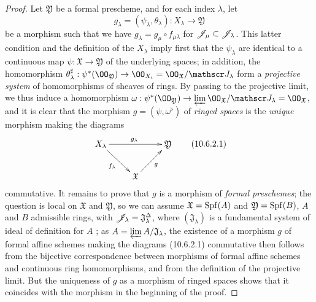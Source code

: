 \begin{proof}
\label{proof-1.10.6.2}
Let $\mathfrak{Y}$ be a formal prescheme, and for each index $\lambda$, let
\[
  g_\lambda=(\psi_\lambda,\theta_\lambda):X_\lambda\to\mathfrak{Y}
\]
be a morphism such that we have $g_\lambda=g_\mu\circ f_{\mu\lambda}$ for $\mathscr{J}_\mu\subset\mathscr{J}_\lambda$.
This latter condition and the definition of the $X_\lambda$ imply first that the $\psi_\lambda$ are identical to a continuous map $\psi:\mathfrak{X}\to\mathfrak{Y}$ of the underlying spaces; in addition, the homomorphism $\theta_\lambda^\sharp:\psi^*(\OO_\mathfrak{Y})\to\OO_{X_i}=\OO_\mathfrak{X}/\sh{J}_\lambda$ form a \emph{projective system} of homomorphisms of sheaves of rings.
By passing to the projective limit, we thus induce a homomorphism $\omega:\psi^*(\OO_\mathfrak{Y})\to\varprojlim\OO_\mathfrak{X}/\sh{J}_\lambda=\OO_\mathfrak{X}$, and it is clear that the morphism $g=(\psi,\omega^\flat)$ of \emph{ringed spaces} is the \emph{unique} morphism making the diagrams
\[
  \xymatrix{
    X_\lambda\ar[rr]^{g_\lambda}\ar[rd]_{f_\lambda} & &
    \mathfrak{Y}\\
    & \mathfrak{X}\ar[ru]_g
  }
  \tag{10.6.2.1}
\]
commutative.
It remains to prove that $g$ is a morphism of \emph{formal preschemes}; the question is local on $\mathfrak{X}$ and $\mathfrak{Y}$, so we can assume $\mathfrak{X}=\operatorname{Spf}(A)$ and $\mathfrak{Y}=\operatorname{Spf}(B)$, $A$ and $B$ admissible rings, with $\mathscr{J}_\lambda=\mathfrak{J}_\lambda^\Delta$, where $(\mathfrak{J}_\lambda)$ is a fundamental system of ideal of definition for $A$ ; as $A=\varprojlim A/\mathfrak{J}_\lambda$, the existence of a morphism $g$ of formal affine schemes making the diagrams (10.6.2.1) commutative then follows from the bijective correspondence  between morphisms of formal affine schemes and continuous ring homomorphisms, and from the definition of the projective limit.
But the uniqueness of $g$ as a morphism of ringed spaces shows that it coincides with the morphism in the beginning of the proof.
\end{proof}

